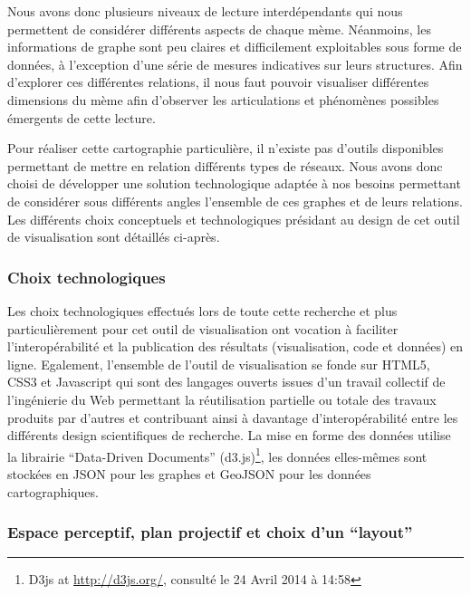 Nous avons donc plusieurs niveaux de lecture interd\'ependants qui nous
permettent de consid\'erer diff\'erents aspects de chaque m\`eme.
N\'eanmoins, les informations de graphe sont peu claires et
difficilement exploitables sous forme de donn\'ees, \`a
l{\textquoteright}exception d{\textquoteright}une s\'erie de mesures
indicatives sur leurs structures. Afin d{\textquoteright}explorer ces
diff\'erentes relations, il nous faut pouvoir visualiser diff\'erentes
dimensions du m\`eme afin d{\textquoteright}observer les articulations
et ph\'enom\`enes possibles \'emergents de cette lecture. 

Pour r\'ealiser cette cartographie particuli\`ere, il
n{\textquoteright}existe pas d{\textquoteright}outils disponibles
permettant de mettre en relation diff\'erents types de r\'eseaux. Nous
avons donc choisi de d\'evelopper une solution technologique adapt\'ee
\`a nos besoins permettant de consid\'erer sous diff\'erents angles
l{\textquoteright}ensemble de ces graphes et de leurs relations. Les
diff\'erents choix conceptuels et technologiques pr\'esidant au design
de cet outil de visualisation sont d\'etaill\'es ci-apr\`es.

\subsubsection{Choix technologiques}

Les choix technologiques effectu\'es lors de toute cette recherche et
plus particuli\`erement pour cet outil de visualisation ont vocation
\`a faciliter l{\textquoteright}interop\'erabilit\'e et la publication
des r\'esultats (visualisation, code et donn\'ees) en ligne. Egalement,
l{\textquoteright}ensemble de l{\textquoteright}outil de visualisation
se fonde sur HTML5, CSS3 et Javascript qui sont des langages ouverts
issues d{\textquoteright}un travail collectif de
l{\textquoteright}ing\'enierie du Web permettant la r\'eutilisation
partielle ou totale des travaux produits par d{\textquoteright}autres
et contribuant ainsi \`a davantage
d{\textquoteright}interop\'erabilit\'e entre les diff\'erents design
scientifiques de recherche. La mise en forme des donn\'ees utilise la
librairie {\textquotedblleft}Data-Driven Documents{\textquotedblright}
(d3.js)\footnote{ D3js at \url{http://d3js.org/,} consult\'e le 24
Avril 2014 \`a 14:58}, les donn\'ees elles-m\^emes sont stock\'ees en
JSON pour les graphes et GeoJSON pour les donn\'ees cartographiques.

\subsubsection{Espace perceptif, plan projectif et choix
d{\textquoteright}un {\textquotedblleft}layout{\textquotedblright}}

